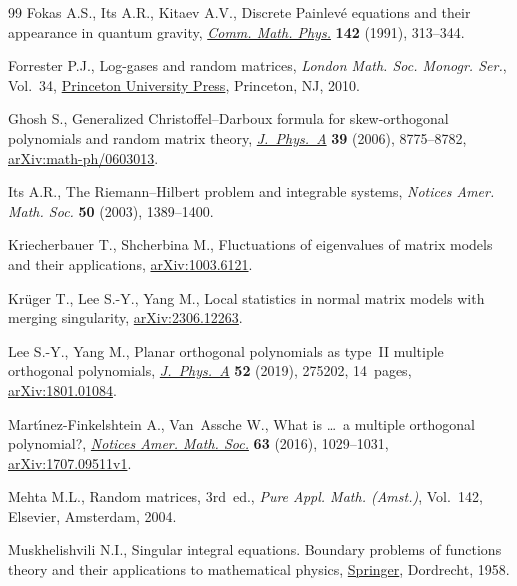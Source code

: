 \documentclass[pdftex]{sigma}
\numberwithin{equation}{section}
\begin{document}
\begin{thebibliography}{99}
Fokas A.S., Its A.R., Kitaev A.V., Discrete {P}ainlev\'e equations and their
 appearance in quantum gravity, \href{https://doi.org/10.1007/BF02102066}{\textit{Comm. Math. Phys.}} \textbf{142}
 (1991), 313--344.

Forrester P.J., Log-gases and random matrices, \textit{London Math. Soc.
 Monogr. Ser.}, Vol.~34, \href{https://doi.org/10.1515/9781400835416}{Princeton University Press}, Princeton, NJ, 2010.

Ghosh S., Generalized {C}hristoffel--{D}arboux formula for skew-orthogonal
 polynomials and random matrix theory, \href{https://doi.org/10.1088/0305-4470/39/28/S02}{\textit{J.~Phys.~A}} \textbf{39} (2006),
 8775--8782, \href{https://arxiv.org/abs/math-ph/0603013}{arXiv:math-ph/0603013}.

Its A.R., The {R}iemann--{H}ilbert problem and integrable systems,
 \textit{Notices Amer. Math. Soc.} \textbf{50} (2003), 1389--1400.

Kriecherbauer T., Shcherbina M., Fluctuations of eigenvalues of matrix models
 and their applications, \href{https://arxiv.org/abs/1003.6121}{arXiv:1003.6121}.

Kr\"uger T., Lee S.-Y., Yang M., Local statistics in normal matrix models with
 merging singularity, \href{https://arxiv.org/abs/2306.12263}{arXiv:2306.12263}.

Lee S.-Y., Yang M., Planar orthogonal polynomials as type~{II} multiple
 orthogonal polynomials, \href{https://doi.org/10.1088/1751-8121/ab1af9}{\textit{J.~Phys.~A}} \textbf{52} (2019), 275202,
 14~pages, \href{https://arxiv.org/abs/1801.01084}{arXiv:1801.01084}.

Mart\'{\i}nez-Finkelshtein A., Van~Assche W., What is \dots\ a multiple
 orthogonal polynomial?, \href{https://doi.org/10.1090/noti1430}{\textit{Notices Amer. Math. Soc.}} \textbf{63} (2016),
 1029--1031, \href{https://arxiv.org/abs/1707.09511v1}{arXiv:1707.09511v1}.

Mehta M.L., Random matrices, 3rd~ed., \textit{Pure Appl. Math. (Amst.)}, Vol.~142, Elsevier, Amsterdam, 2004.

Muskhelishvili N.I., Singular integral equations. Boundary problems of
 functions theory and their applications to mathematical physics, \href{https://doi.org/10.1007/978-94-009-9994-7}{Springer},
 Dordrecht, 1958.


\end{thebibliography}
\end{document}
